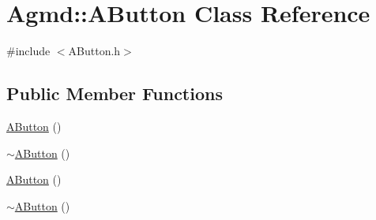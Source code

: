 \hypertarget{class_agmd_1_1_a_button}{\section{Agmd\+:\+:A\+Button Class Reference}
\label{class_agmd_1_1_a_button}
}


{\ttfamily \#include $<$A\+Button.\+h$>$}

\subsection*{Public Member Functions}
\begin{DoxyCompactItemize}
\item 
\hyperlink{class_agmd_1_1_a_button_abcfc5830fbd61f01b3a392e8b703eb39}{A\+Button} ()
\item 
\hyperlink{class_agmd_1_1_a_button_a539e171c115afcacf5ac5ab76fe44639}{$\sim$\+A\+Button} ()
\item 
\hyperlink{class_agmd_1_1_a_button_abcfc5830fbd61f01b3a392e8b703eb39}{A\+Button} ()
\item 
\hyperlink{class_agmd_1_1_a_button_a539e171c115afcacf5ac5ab76fe44639}{$\sim$\+A\+Button} ()
\end{DoxyCompactItemize}


